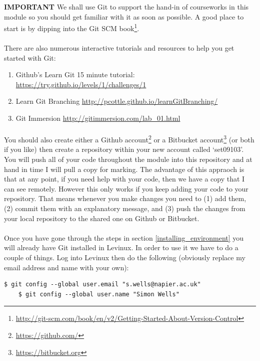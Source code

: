 \documentclass[12pt, a4paper, twoside]{book}
\begin{document}
\begin{framed}
\textbf{IMPORTANT} We shall use Git to support the hand-in of courseworks in this module so you should get familiar with it as soon as possible. A good place to start is by dipping into the Git SCM book\footnote{\url{http://git-scm.com/book/en/v2/Getting-Started-About-Version-Control}}.

\paragraph{} There are also numerous interactive tutorials and resources to help you get started with Git:
\begin{enumerate}
\item Github's Learn Git 15 minute tutorial: \url{https://try.github.io/levels/1/challenges/1}
\item Learn Git Branching \url{http://pcottle.github.io/learnGitBranching/}
\item Git Immersion \url{http://gitimmersion.com/lab_01.html}
\end{enumerate}

\paragraph{} You should also create either a Github account\footnote{\url{https://github.com/}} or a Bitbucket account\footnote{\url{https://bitbucket.org}} (or both if you like) then create a repository within your new account called `set09103'. You will push all of your code throughout the module into this repository and at hand in time I will pull a copy for marking. The advantage of this appraoch is that at any point, if you need help with your code, then we have a copy that I can see remotely. However this only works if you keep adding your code to your repository. That means whenever you make changes you need to (1) add them, (2) commit them with an explanatory message,  and (3) push the changes from your local repository to the shared one on Github or Bitbucket.

\end{framed}

\paragraph{} Once you have gone through the steps in section \ref{installing_environment} you will already have Git installed in Levinux. In order to use it we have to do a couple of things. Log into Levinux then do the following (obviously replace my email address and name with your own):
\begin{lstlisting}[style=DOS]
    $ git config --global user.email "s.wells@napier.ac.uk"
    $ git config --global user.name "Simon Wells"
\end{lstlisting}
\end{document}

